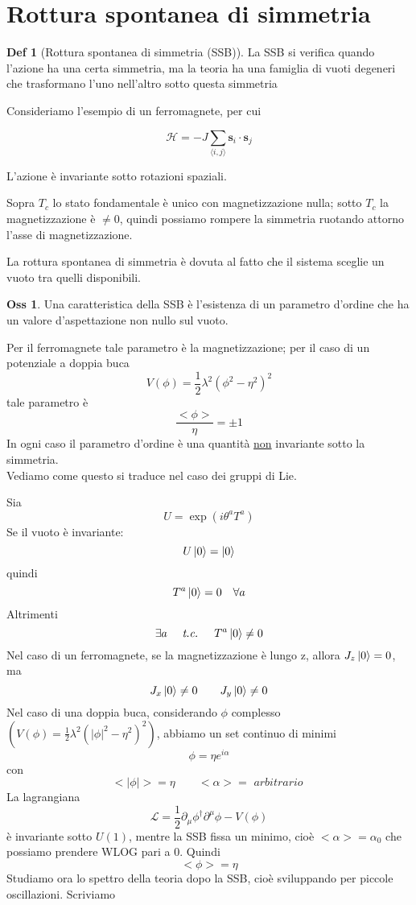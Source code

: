 \documentclass[10pt,a4paper]{article}
\theoremstyle{definition}
\newtheorem{definition}{Def}[section]
\newtheorem{observation}{Oss}[section]
\begin{document}
\section{Rottura spontanea di simmetria}

\begin{definition}[Rottura spontanea di simmetria (SSB)]
    La SSB si verifica quando l'azione ha una certa simmetria, ma la teoria ha una famiglia di vuoti degeneri che trasformano l'uno nell'altro sotto questa simmetria

\end{definition}
Consideriamo l'esempio di un ferromagnete, per cui

\[
\mathcal{H} = -J\sum_{\langle i,j \rangle} \mathbf{s}_i \cdot \mathbf{s}_j
\]

L'azione è invariante sotto rotazioni spaziali.

Sopra $T_c$ lo stato fondamentale è unico con magnetizzazione nulla; sotto $T_c$ la magnetizzazione è $\neq 0$, quindi possiamo rompere la simmetria ruotando attorno l'asse di magnetizzazione.

La rottura spontanea di simmetria è dovuta al fatto che il sistema sceglie un vuoto tra quelli disponibili.

\begin{observation}
Una caratteristica della SSB è l'esistenza di un parametro d'ordine che ha un valore d'aspettazione non nullo sul vuoto.
\end{observation}
Per il ferromagnete tale parametro è la magnetizzazione; per il caso di un potenziale a doppia buca
\[
V(\phi) = \frac{1}{2}\lambda^2(\phi^2 - \eta^2)^2    
\]
tale parametro è 
\[
\frac{<\phi>}{\eta} = \pm 1    
\]
In ogni caso il parametro d'ordine è una quantità \underline{non} invariante sotto la simmetria.
\\
Vediamo come questo si traduce nel caso dei gruppi di Lie.

Sia 
\[U = \exp(i\theta^a T^a)\]
Se il vuoto è invariante:
\[
    U\ket{0} = \ket{0} 
\]
quindi
\[T^a\ket{0} = 0 \quad \forall a\]
Altrimenti 
\[
\exists a \quad \textit{ t.c. } \quad T^a\ket{0} \neq 0    
\]
Nel caso di un ferromagnete, se la magnetizzazione è lungo z, allora $J_z\ket{0} = 0$, ma
\[
J_x \ket{0} \neq 0 \qquad J_y \ket{0} \neq 0    
\]
Nel caso di una doppia buca, considerando $\phi$ complesso \((V(\phi) = \frac{1}{2}\lambda^2 (|\phi|^2 - \eta^2)^2)\), abbiamo un set continuo di minimi
\[
\phi = \eta e^{i\alpha}    
\]
con 
\[
<|\phi|> = \eta \qquad <\alpha> = \textit{ arbitrario }  
\]
La lagrangiana 
\[
\mathcal{L} = \frac12\partial_\mu\phi^\dagger \partial^\mu\phi - V(\phi)   
\]
è invariante sotto $U(1)$, mentre la SSB fissa un minimo, cioè $<\alpha> = \alpha_0$ che possiamo prendere WLOG pari a 0. Quindi
\[
<\phi> = \eta    
\]
Studiamo ora lo spettro della teoria dopo la SSB, cioè sviluppando per piccole oscillazioni. Scriviamo
\end{document}
